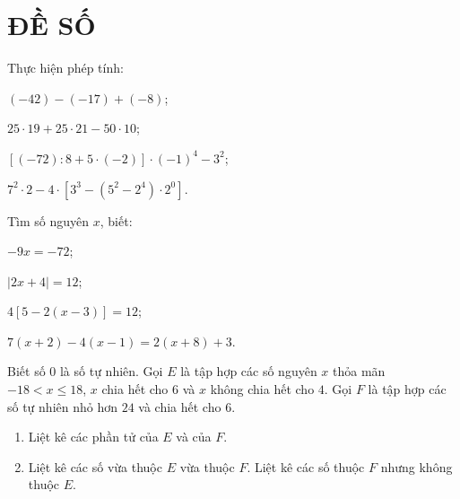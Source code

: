 
\section{ĐỀ SỐ \thesection }
\setcounter{bt}{0}

\begin{bt} Thực hiện phép tính:
	\begin{listEX}
		\item $(-42)-(-17)+(-8)$;
		\item $25\cdot 19+25\cdot 21-50\cdot 10$;
		\item $\left[(-72):8+5\cdot(-2)\right]\cdot(-1)^{4}-3^{2}$;
		\item $7^{2}\cdot 2-4\cdot\left[3^{3}-\left(5^{2}-2^{4}\right)\cdot 2^{0}\right]$.
	\end{listEX}
\end{bt}

\begin{bt} Tìm số nguyên $x$, biết:
	\begin{listEX}
		\item $-9x=-72$;
		\item $|2x+4|=12$;
		\item $4\left[5-2(x-3)\right]=12$;
		\item $7(x+2)-4(x-1)=2(x+8)+3$.
	\end{listEX}
\end{bt}

\begin{bt} Biết số $0$ là số tự nhiên. Gọi $E$ là tập hợp các số nguyên $x$ thỏa mãn $-18<x\le 18$, $x$ chia hết cho $6$ và $x$ không chia hết cho $4$. Gọi $F$ là tập hợp các số tự nhiên nhỏ hơn $24$ và chia hết cho $6$.
	\begin{enumerate}
		\item Liệt kê các phần tử của $E$ và của $F$.
		\item Liệt kê các số vừa thuộc $E$ vừa thuộc $F$. Liệt kê các số thuộc $F$ nhưng không thuộc $E$.
	\end{enumerate}
\end{bt}

